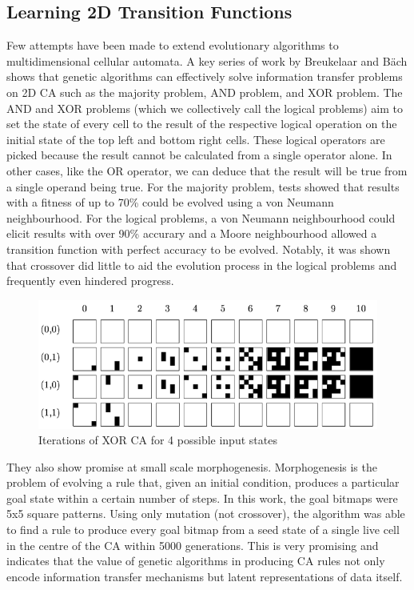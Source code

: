 \subsection{Learning 2D Transition Functions}

Few attempts have been made to extend evolutionary algorithms to multidimensional cellular automata. A key series of work by Breukelaar and B{\"a}ch\cite{breukelaar2004evolving} shows that genetic algorithms can effectively solve information transfer problems on 2D CA such as the majority problem, AND problem, and XOR problem. The AND and XOR problems (which we collectively call the logical problems) aim to set the state of every cell to the result of the respective logical operation on the initial state of the top left and bottom right cells. These logical operators are picked because the result cannot be calculated from a single operator alone. In other cases, like the OR operator, we can deduce that the result will be true from a single operand being true. For the majority problem, tests showed that results with a fitness of up to 70\% could be evolved using a von Neumann neighbourhood. For the logical problems, a von Neumann neighbourhood could elicit results with over 90\% accurary and a Moore neighbourhood allowed a transition function with perfect accuracy to be evolved. Notably, it was shown that crossover did little to aid the evolution process in the logical problems and frequently even hindered progress.\\

\begin{figure}[!h]
\centering
\includegraphics[width=.8\textwidth]{images/XOR-ca.png}
\caption{Iterations of XOR CA for 4 possible input states}
\label{fig:nca}
\end{figure}

They also show promise at small scale morphogenesis. Morphogenesis is the problem of evolving a rule that, given an initial condition, produces a particular goal state within a certain number of steps. In this work, the goal bitmaps were 5x5 square patterns. Using only mutation (not crossover), the algorithm was able to find a rule to produce every goal bitmap from a seed state of a single live cell in the centre of the CA within 5000 generations. This is very promising and indicates that the value of genetic algorithms in producing CA rules not only encode information transfer mechanisms but latent representations of data itself.\\

